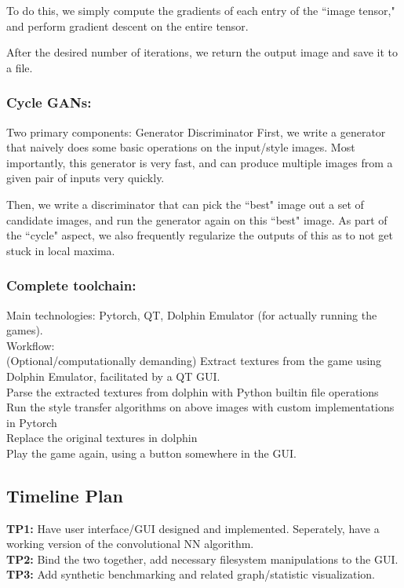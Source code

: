 \documentclass[12pt]{article}
\begin{document}
    To do this, we simply compute the gradients of each entry of the ``image tensor," and perform gradient descent on the entire tensor. 

    After the desired number of iterations, we return the output image and save it to a file.

    \subsubsection{Cycle GANs:}
    Two primary components:
    Generator 
    Discriminator
    First, we write a generator that naively does some basic operations on the input/style images. Most importantly, this generator is very fast, and can produce multiple images from a given pair of inputs very quickly. 

    Then, we write a discriminator that can pick the ``best" image out a set of candidate images, and run the generator again on this ``best" image. As part of the ``cycle" aspect, we also frequently regularize the outputs of this as to not get stuck in local maxima. 
    \subsubsection{Complete toolchain:}
    Main technologies: Pytorch, QT, Dolphin Emulator (for actually running the games). \\
    Workflow: \\
    (Optional/computationally demanding) Extract textures from the game using Dolphin Emulator, facilitated by a QT GUI. \\
    Parse the extracted textures from dolphin with Python builtin file operations \\
    Run the style transfer algorithms on above images with custom implementations in Pytorch \\
    Replace the original textures in dolphin \\
    Play the game again, using a button somewhere in the GUI. \\

\subsection{Timeline Plan}
    \textbf{TP1:} Have user interface/GUI designed and implemented. Seperately, have a working version of the convolutional NN algorithm.\\
    \textbf{TP2:} Bind the two together, add necessary filesystem manipulations to the GUI.\\ 
    \textbf{TP3:} Add synthetic benchmarking and related graph/statistic visualization.\\
\end{document}
